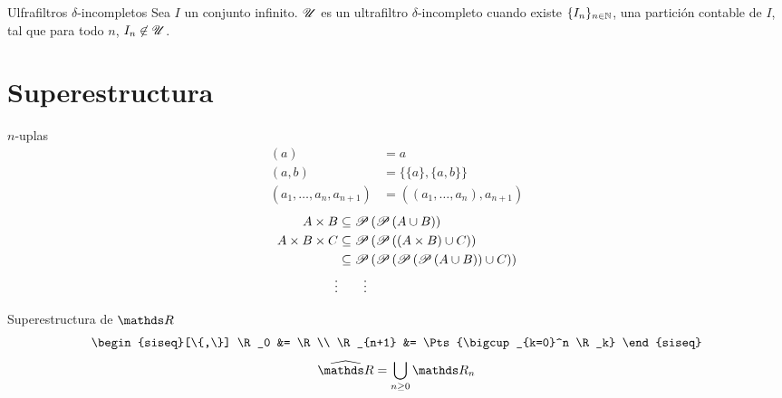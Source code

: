 \documentclass{beamer}
\begin{document}
\begin{frame}{Ulfrafiltros $\delta$-incompletos}
  Sea $I$ un conjunto infinito. $\mathscr{U}$ es un ultrafiltro $\delta$-incompleto
  cuando existe $\{I_n\}_{n\in\mathbb{N}}$, una partición contable de $I$, tal que
  para todo $n$, $I_n \not\in\mathscr{U}$.
  \begin{center}
  \end{center}
\end{frame}

\section{Superestructura}
\begin{frame}{$n$-uplas}
  \begin{align*}
    (a) &= a\\
    (a,b) &= \{\{a\}, \{a,b\}\}\\
    (a_1,\dots,a_n,a_{n+1}) &= ((a_1,\dots,a_n),a_{n+1})
  \end{align*}
  \begin{align*}
    A\times B &\subseteq \mathscr{P}\left(\mathscr{P}\left(A\cup B\right)\right)\\
    A\times B\times C &\subseteq \mathscr{P}\left(\mathscr{P}\left((A\times B)\cup C\right)\right)\\
    & \subseteq \mathscr{P}\left(\mathscr{P}\left(\mathscr{P}\left(\mathscr{P}\left(A\cup B\right)\right)\cup C\right)\right)\\
    \vdots & \qquad\vdots
  \end{align*}
\end{frame}
\begin{frame}{Superestructura de $\R$}
  \[
    \begin{siseq}[\{,\}]
      \R_0 &= \R\\
      \R_{n+1} &= \Pts{\bigcup_{k=0}^n \R_k}
    \end{siseq}
  \]
  \[\Rh = \bigcup_{n\geq 0} \R_n\]
\end{frame}
\end{document}
